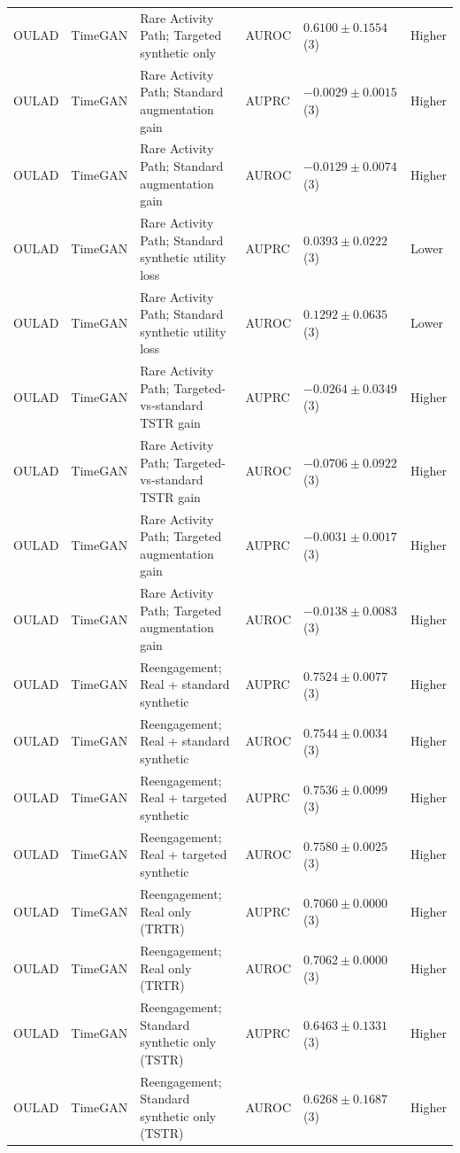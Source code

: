 \begin{longtable}{@{}p{2.25cm}p{2.05cm}p{4.7cm}p{5.0cm}p{2.6cm}p{1.25cm}@{}}
OULAD & TimeGAN & Rare Activity Path; Targeted synthetic only & AUROC & $0.6100 \mathbin{\pm} 0.1554$ (3) & Higher \\
OULAD & TimeGAN & Rare Activity Path; Standard augmentation gain & AUPRC & $-0.0029 \mathbin{\pm} 0.0015$ (3) & Higher \\
OULAD & TimeGAN & Rare Activity Path; Standard augmentation gain & AUROC & $-0.0129 \mathbin{\pm} 0.0074$ (3) & Higher \\
OULAD & TimeGAN & Rare Activity Path; Standard synthetic utility loss & AUPRC & $0.0393 \mathbin{\pm} 0.0222$ (3) & Lower \\
OULAD & TimeGAN & Rare Activity Path; Standard synthetic utility loss & AUROC & $0.1292 \mathbin{\pm} 0.0635$ (3) & Lower \\
OULAD & TimeGAN & Rare Activity Path; Targeted-vs-standard TSTR gain & AUPRC & $-0.0264 \mathbin{\pm} 0.0349$ (3) & Higher \\
OULAD & TimeGAN & Rare Activity Path; Targeted-vs-standard TSTR gain & AUROC & $-0.0706 \mathbin{\pm} 0.0922$ (3) & Higher \\
OULAD & TimeGAN & Rare Activity Path; Targeted augmentation gain & AUPRC & $-0.0031 \mathbin{\pm} 0.0017$ (3) & Higher \\
OULAD & TimeGAN & Rare Activity Path; Targeted augmentation gain & AUROC & $-0.0138 \mathbin{\pm} 0.0083$ (3) & Higher \\
OULAD & TimeGAN & Reengagement; Real + standard synthetic & AUPRC & $0.7524 \mathbin{\pm} 0.0077$ (3) & Higher \\
OULAD & TimeGAN & Reengagement; Real + standard synthetic & AUROC & $0.7544 \mathbin{\pm} 0.0034$ (3) & Higher \\
OULAD & TimeGAN & Reengagement; Real + targeted synthetic & AUPRC & $0.7536 \mathbin{\pm} 0.0099$ (3) & Higher \\
OULAD & TimeGAN & Reengagement; Real + targeted synthetic & AUROC & $0.7580 \mathbin{\pm} 0.0025$ (3) & Higher \\
OULAD & TimeGAN & Reengagement; Real only (TRTR) & AUPRC & $0.7060 \mathbin{\pm} 0.0000$ (3) & Higher \\
OULAD & TimeGAN & Reengagement; Real only (TRTR) & AUROC & $0.7062 \mathbin{\pm} 0.0000$ (3) & Higher \\
OULAD & TimeGAN & Reengagement; Standard synthetic only (TSTR) & AUPRC & $0.6463 \mathbin{\pm} 0.1331$ (3) & Higher \\
OULAD & TimeGAN & Reengagement; Standard synthetic only (TSTR) & AUROC & $0.6268 \mathbin{\pm} 0.1687$ (3) & Higher \\

\end{longtable}
